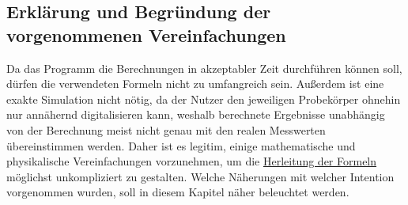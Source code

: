 \documentclass[reducespace,stylepage,semiarbeit]{spezidoc}
\begin{document}
\subsection{Erklärung und Begründung der vorgenommenen Vereinfachungen}
Da das Programm die Berechnungen in akzeptabler Zeit durchführen können soll, dürfen die verwendeten Formeln nicht zu umfangreich sein. 
Außerdem ist eine exakte Simulation nicht nötig, da der Nutzer den jeweiligen Probekörper ohnehin nur annähernd digitalisieren kann, weshalb berechnete Ergebnisse unabhängig von der Berechnung meist nicht genau mit den realen Messwerten übereinstimmen werden. 
Daher ist es legitim, einige mathematische und physikalische Vereinfachungen vorzunehmen, um die \hyperref[sec:herleitung]{Herleitung der Formeln} möglichst unkompliziert zu gestalten. 
Welche Näherungen mit welcher Intention vorgenommen wurden, soll in diesem Kapitel näher beleuchtet werden.
\end{document}
